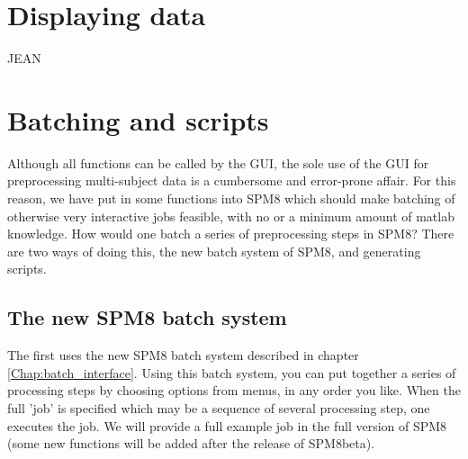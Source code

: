 \section{Displaying data}
JEAN


\section{Batching and scripts}
Although all functions can be called by the GUI, the sole use 
of the GUI for preprocessing multi-subject data is a cumbersome 
and error-prone affair. For this reason, we have put in some functions 
into SPM8 which should make batching of otherwise very interactive jobs 
feasible, with no or a minimum amount of matlab knowledge.
How would one batch a series of preprocessing steps in SPM8? 
There are two ways of doing this, the new batch system of SPM8, and generating scripts. 

\subsection{The new SPM8 batch system}
The first uses the new SPM8 batch system described in chapter \ref{Chap:batch_interface}. 
Using this batch system, you can put together a series of processing
steps by choosing options from menus, in any order you like. 
When the full 'job' is specified which may be a sequence of several 
processing step, one executes the job. We will provide a full example
job in the full version of SPM8 (some new functions will be added after the release of SPM8beta). 



